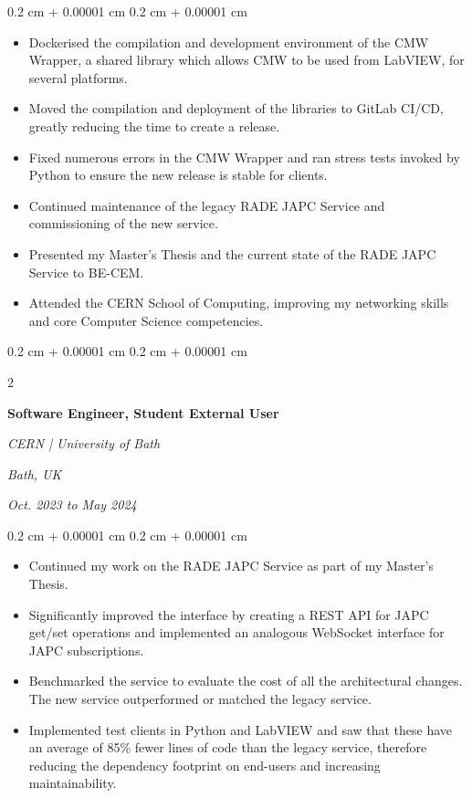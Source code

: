 \documentclass[10pt, letterpaper]{article}
\newenvironment{highlights}{
    \begin{itemize}[
        topsep=0.10 cm,
        parsep=0.10 cm,
        partopsep=0pt,
        itemsep=0pt,
        leftmargin=0.4 cm + 10pt
    ]
}{
    \end{itemize}
} %
\newenvironment{onecolentry}{
    \begin{adjustwidth}{
        0.2 cm + 0.00001 cm
    }{
        0.2 cm + 0.00001 cm
    }
}{
    \end{adjustwidth}
} %
\newenvironment{twocolentry}[2][]{
    \onecolentry
    \def\secondColumn{#2}
    \setcolumnwidth{\fill, 4.5 cm}
    \begin{paracol}{2}
}{
    \switchcolumn \raggedleft \secondColumn
    \end{paracol}
    \endonecolentry
} %
\begin{document}
        \begin{onecolentry}
            \begin{highlights}
                \item Dockerised the compilation and development environment of the CMW Wrapper, a shared library which allows CMW to be used from LabVIEW, for several platforms. 
                \item Moved the compilation and deployment of the libraries to GitLab CI/CD, greatly reducing the time to create a release.
                \item Fixed numerous errors in the CMW Wrapper and ran stress tests invoked by Python to ensure the new release is stable for clients. 
                \item Continued maintenance of the legacy RADE JAPC Service and commissioning of the new service. 
                \item Presented my Master's Thesis and the current state of the RADE JAPC Service to BE-CEM. 
                \item Attended the CERN School of Computing, improving my networking skills and core Computer Science competencies.
               
            \end{highlights}
        \end{onecolentry}


        \vspace{0.2 cm-3px}
        
        \begin{twocolentry}{
        \textit{Bath, UK}    
            
        \textit{Oct. 2023 to May 2024}}
            \textbf{Software Engineer, Student External User}
            
            \textit{CERN | University of Bath}
        \end{twocolentry}

        \vspace{0.10 cm-3px}
        \begin{onecolentry}
            \begin{highlights}
                \item Continued my work on the RADE JAPC Service as part of my Master's Thesis. 
                \item Significantly improved the interface by creating a REST API for JAPC get/set operations and implemented an analogous WebSocket interface for JAPC subscriptions. 
                \item Benchmarked the service to evaluate the cost of all the architectural changes. The new service outperformed or matched the legacy service.
                \item Implemented test clients in Python and LabVIEW and saw that these have an average of 85\% fewer lines of code than the legacy service, therefore reducing the dependency footprint on end-users and increasing maintainability.
            \end{highlights}
        \end{onecolentry}
\end{document}
